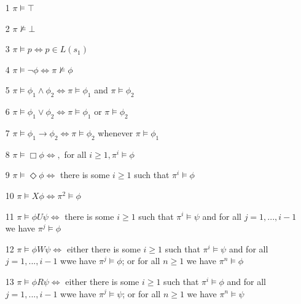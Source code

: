 \begin{itemize}

\item[1] $\pi \models \top$

\item[2] $\pi \not\models \bot$

\item[3] $\pi \models p \Leftrightarrow p \in L(s_1)$

\item[4] $\pi \models \neg \phi \Leftrightarrow \pi \not\models \phi$

\item[5] $\pi \models \phi_1 \wedge \phi_2 \Leftrightarrow \pi \models \phi_1$ and $\pi \models \phi_2$

\item[6] $\pi \models \phi_1 \vee \phi_2 \Leftrightarrow \pi \models \phi_1$ or $\pi \models \phi_2$

\item[7] $\pi \models \phi_1 \rightarrow \phi_2 \Leftrightarrow \pi \models \phi_2$ whenever $\pi \models \phi_1$

\item[8] $\pi \models \Box \phi \Leftrightarrow,$ for all $i \geq 1, \pi^i \models \phi$

\item[9] $\pi \models \Diamond \phi \Leftrightarrow$ there is some $i \geq 1$ such that $\pi^i \models \phi$

\item[10] $\pi \models X\phi \Leftrightarrow \pi^2 \models \phi$

\item[11] $\pi \models \phi U \psi \Leftrightarrow$ there is some $i \geq 1$ such that $\pi^i \models \psi$ and for all $j = 1,...,i - 1$ we have $\pi^j \models \phi$

\item[12] $\pi \models \phi W \psi \Leftrightarrow$ either there is some $i \geq 1$ such that $\pi^i \models \psi$ and for all $j = 1,...,i -1$ wwe have $\pi^j \models \phi$; or for all $n \geq 1$ we have $\pi^n \models \phi$

\item[13] $\pi \models \phi R \psi \Leftrightarrow$ either there is some $i \geq 1$ such that $\pi^i \models \phi$ and for all $j = 1,...,i -1$ wwe have $\pi^j \models \psi$; or for all $n \geq 1$ we have $\pi^n \models \psi$
\end{itemize} 
